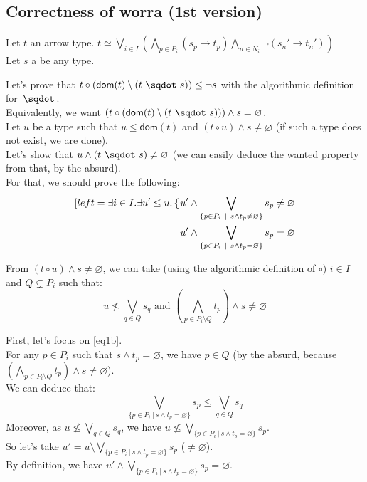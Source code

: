 \documentclass[a4paper]{article}%
\newcommand{\worra}[2]{#1\mathop{\,\sqdot\,} #2}
\newcommand{\apply}[2]{#1\circ#2}
\newcommand{\dom}[1]{\textsf{dom}(#1)}
\newcommand{\alt}{~|~}
\begin{document}
    \subsection{Correctness of worra (1st version)}
    
    Let $t$ an arrow type. $t \simeq \bigvee_{i\in I}\left(\bigwedge_{p\in P_i}(s_p\to t_p)\bigwedge_{n\in N_i}\neg(s_n'\to t_n')\right)$\\
    Let $s$ a be any type.

    Let's prove that $\apply t {(\dom t \setminus (\worra t s))} \leq \neg s$ with the algorithmic definition for $\worra {} {}$.\\
    Equivalently, we want $(\apply t {(\dom t \setminus (\worra t s))}) \land s = \varnothing$.\\

    Let $u$ be a type such that $u \leq \dom t$ and $(\apply t u) \land s \neq \varnothing$ (if such a type does not exist, we are done).\\
    Let's show that $u \land (\worra t s) \neq \varnothing$ (we can easily deduce the wanted property from that, by the absurd).\\
    For that, we should prove the following:\\

    \begin{subequations}
        \begin{align}[left ={\exists i \in I. \exists u' \leq u. \empheqlbrace}]
          &u' \land \bigvee_{\{p\in P_i\alt s\wedge t_p\not=\varnothing\}}s_p \neq \varnothing\label{eq1a}\\
          &u' \land \bigvee_{\{p \in P_i \alt s \land t_p = \varnothing\}}s_p = \varnothing\label{eq1b}
        \end{align}
    \end{subequations}

  From $(\apply t u) \land s \neq \varnothing$, we can take (using the algorithmic definition of $\circ$) $i \in I$ and $Q \subsetneq P_i$ such that:\\
  \[ u \not\leq\bigvee_{q\in Q}s_q \text{\ \ \ and\ \ \ } (\bigwedge_{p\in P_i\setminus Q}t_p) \land s \neq \varnothing \]

    First, let's focus on \cref{eq1b}.\\
    For any $p \in P_i$ such that $s \land t_p = \varnothing$, we have $p \in Q$ (by the absurd, because $(\bigwedge_{p\in P_i\setminus Q}t_p) \land s \neq \varnothing$).\\
    We can deduce that:
    \[ \bigvee_{\{p \in P_i \alt s \land t_p = \varnothing\}}s_p \leq \bigvee_{q \in Q}s_q \]
    Moreover, as $u \not\leq\bigvee_{q\in Q}s_q$, we have $u \not\leq\bigvee_{\{p \in P_i \alt s \land t_p = \varnothing\}}s_p$.\\
    So let's take $u' = u \setminus \bigvee_{\{p \in P_i \alt s \land t_p = \varnothing\}}s_p$ ($\neq \varnothing$).\\
    By definition, we have $u' \land \bigvee_{\{p \in P_i \alt s \land t_p = \varnothing\}}s_p = \varnothing$.\\
 
\end{document}
